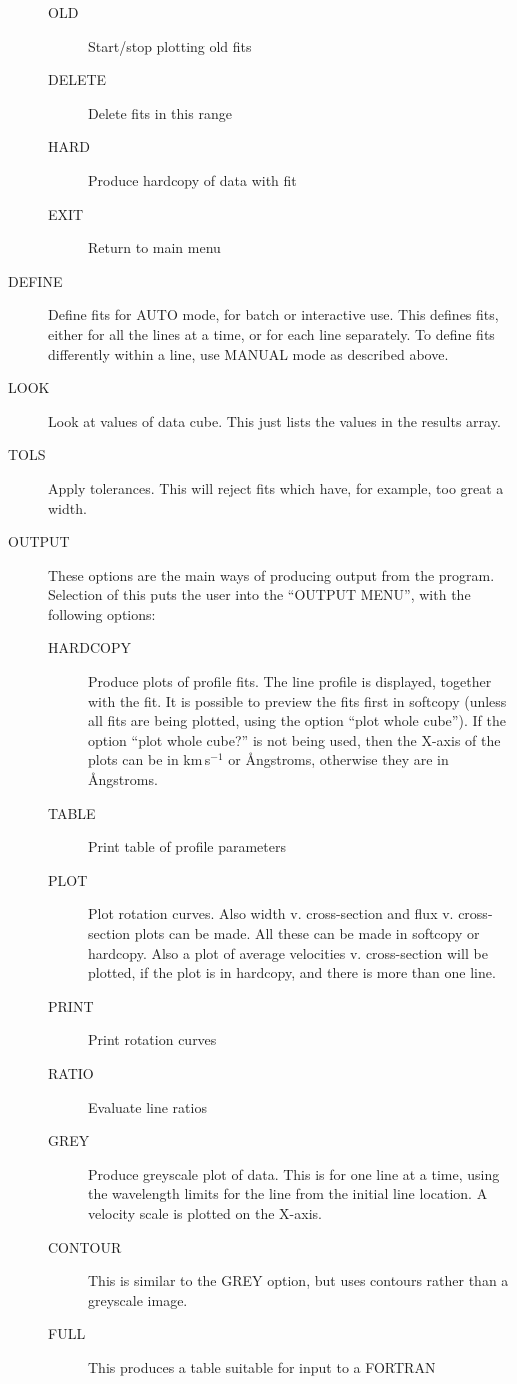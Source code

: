\begin{description}
\begin{description}
\item[OLD] Start/stop plotting old fits
\item[DELETE] Delete fits in this range
\item[HARD] Produce hardcopy of data with fit
\item[EXIT] Return to main menu
\end{description}
\item[DEFINE] Define fits for AUTO mode, for batch or interactive use.
This defines fits, either for all the lines at a time, or for each line
separately.
To define fits differently within a line, use MANUAL mode as described
above.
\item[LOOK] Look at values of data cube.
This just lists the values in the results array.
\item[TOLS] Apply tolerances.
This will reject fits which have, for example, too great a width.
\item[OUTPUT] These options are the main ways of producing output
from the program.
Selection of this puts the user into the ``OUTPUT MENU'', with the
following options:
\begin{description}
\item[HARDCOPY] Produce plots of profile fits.
The line profile is displayed, together with the fit.
It is possible to preview the fits first in softcopy (unless all fits
are being plotted, using the option ``plot whole cube'').
If the option ``plot whole cube?'' is not being used, then the X-axis of
the plots can be in km\,s$^{-1}$ or {\AA}ngstroms, otherwise they are in
{\AA}ngstroms.
\item[TABLE] Print table of profile parameters
\item[PLOT] Plot rotation curves.
Also width v. cross-section and flux v. cross-section plots can be made.
All these can be made in softcopy or hardcopy.
Also a plot of average velocities v. cross-section will be plotted, if
the plot is in hardcopy, and there is more than one line.
\item[PRINT] Print rotation curves
\item[RATIO] Evaluate line ratios
\item[GREY] Produce greyscale plot of data.
This is for one line at a time, using the wavelength limits for the line
from the initial line location.
A velocity scale is plotted on the X-axis.
\item[CONTOUR] This is similar to the GREY option, but uses contours
rather than a greyscale image.
\item[FULL] This produces a table suitable for input to a FORTRAN

\end{description}
\end{description}
